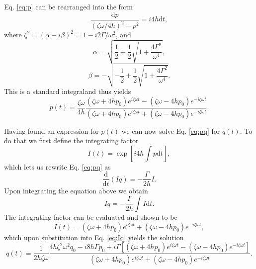Eq. \eqref{eq:p} can be rearranged into the form
\begin{equation}
  \frac{ \mathrm{d} p } { (\zeta \omega / 4 h)^2 - p^2 } = i 4 h
  \mathrm{d} t,
\end{equation}
where $\zeta^2 = (\alpha - i \beta)^2 = 1 - i 2 \Gamma / \omega^2$, and
\begin{equation}
  \alpha = \sqrt{ \frac{1}{2} + \frac{1}{2} \sqrt{1 + \frac{ 4\Gamma^2
      }{ \omega^4 }}},
\end{equation}
\begin{equation}
  \beta = -\sqrt{ -\frac{1}{2} + \frac{1}{2} \sqrt{1 + \frac{ 4\Gamma^2
      }{ \omega^4 }}}.
\end{equation}
This is a standard integral\footnotemark and thus yields
\begin{equation}
  \label{eq:psol}
  p(t) = \frac{ \zeta \omega } { 4 h } 
  \frac{ ( \zeta \omega + 4 h p_0 )e^{i \zeta \omega t} - ( \zeta
    \omega - 4 h p_0 ) e^{-i \zeta \omega t} }
  { ( \zeta \omega + 4 h p_0 )e^{i \zeta \omega t} + ( \zeta \omega
    - 4 h p_0 ) e^{-i \zeta \omega t} }.
\end{equation}

\footnotetext{ \[ \int \frac{\mathrm{d} x}{a^2 - x^2} = \frac{1}{2a}
    \ln \left( \frac{a+x}{a-x} \right) + \mathrm{const.} 
    \quad\quad\quad\quad\quad\quad\quad\quad\quad\quad\quad\quad\quad\quad\quad
    \quad\quad\quad\quad\quad\] }

Having found an expression for $p(t)$ we can now solve
Eq. \eqref{eq:pq} for $q(t)$. To do that we first define the
integrating factor
\begin{equation}
  I(t) = \exp \left[ i 4 h \int p \mathrm{d} t \right],
\end{equation}
which lets us rewrite Eq. \eqref{eq:pq} as
\begin{equation}
  \frac{\mathrm{d}} {\mathrm{d} t}(Iq) = - \frac{\Gamma}{2 h} I.
\end{equation}
Upon integrating the equation above we obtain
\begin{equation}
  \label{eq:Iq}
  Iq = - \frac{ \Gamma } {2 h} \int I \mathrm{d} t.
\end{equation}
The integrating factor can be evaluated and shown to be
\begin{equation}
  I(t) = ( \zeta \omega + 4 h p_0 )e^{i \zeta \omega t} + 
  ( \zeta \omega - 4 h p_0 )e^{-i \zeta \omega t},
\end{equation}
which upon substitution into Eq. \eqref{eq:Iq} yields the solution
\begin{equation}
  \label{eq:qsol}
  q(t) = \frac{1}{2 h \zeta \omega} 
  \frac{4 h \zeta^2 \omega^2 q_0 - i 8 h \Gamma p_0
    + i \Gamma [( \zeta \omega + 4 h p_0 )e^{i \zeta \omega t} - 
    ( \zeta \omega - 4 h p_0 )e^{-i \zeta \omega t}]}
  { ( \zeta \omega + 4 h p_0 )e^{i \zeta \omega t} + 
    ( \zeta \omega - 4 h p_0 )e^{-i \zeta \omega t}}.
\end{equation}

